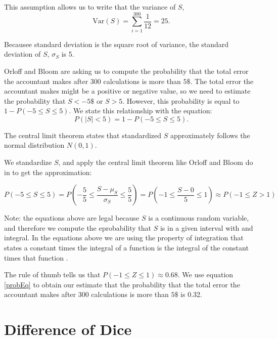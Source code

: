 \documentclass[a4paper,11pt]{article}
\begin{document}
This assumption allows us to write that the variance of $S$,
\begin{equation}
  \text{Var}\left(S \right) = \sum_{i=1}^300 \frac{1}{12} = 25.
\end{equation}

Becausee standard deviation is the square root of variance, the standard
deviation of $S$, $\sigma_S$ is 5.

Orloff and Bloom are asking us to compute the probability that the total error
the accountant makes after 300 calculations is more than $5\$$.  The total error
the accountant makes might be a positive or negative value, so we need to
estimate the probability that $S < -5\$$ or $S > 5$. However, this probability
is equal to $1 - P\left( -5 \leq S \leq 5 \right)$. We state this relationship
with the equation:
\begin{equation}\label{probEq}
  P\left(\left|S\right| < 5 \right) = 1 - P\left( -5 \leq S \leq 5 \right).
\end{equation}

The central limit theorem states that standardized $S$ approximately follows
the normal distribution $N\left( 0, 1 \right)$.

We standardize $S$, and apply the central limit theorem like Orloff and
Bloom do in \cite{reading6b} to get the approximation:

\begin{equation}
P \left( -5 \leq S \leq 5 \right)
=P \left( -\frac{5}{5} \leq \frac{S-\mu_S}{\sigma_S} \leq \frac{5}{5} \right)
=P \left( -1 \leq \frac{S-0}{5} \leq 1 \right)
  \approx P\left(-1 \leq Z > 1 \right)
\end{equation}

Note: the equations above are legal because $S$ is a continuous random
variable, and therefore we compute the eprobability that $S$ is in a given
interval with and integral. In the equations above we are using the
property of integration that states a constant times the integral of a function
is the integral of the constant times that function \cite{basicInt}.

The rule of thumb \cite{reading6b} tells us that
$P\left(-1 \leq Z \leq 1 \right) \approx 0.68$.  We use equation \ref{probEq} to
obtain our estimate that the probability that the total error the accountant
makes after 300 calculations is more than $5\$$ is 0.32.


\section{Difference of Dice}
\end{document}
